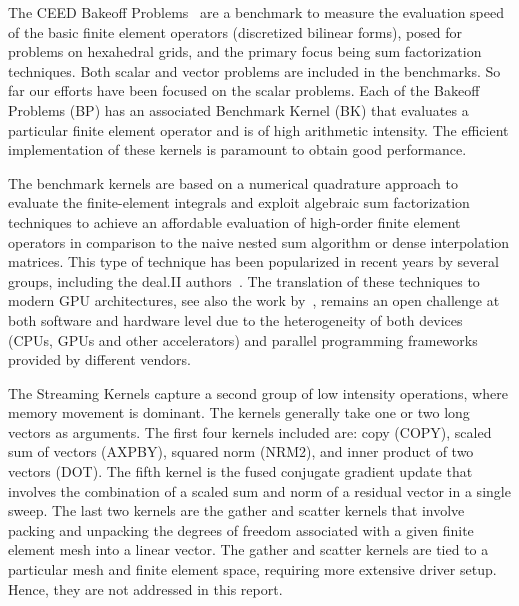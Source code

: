 \documentclass[a4paper,12pt]{article}
\begin{document}
The CEED Bakeoff Problems~\citep{Fischer20scalability} are a benchmark to measure the evaluation speed of the basic finite element operators (discretized bilinear forms), posed for problems on hexahedral grids, and the primary focus being sum factorization techniques. 
Both scalar and vector  problems are included in the benchmarks. So far our efforts have been focused on the scalar problems.
Each of the Bakeoff Problems (BP) has an associated Benchmark Kernel (BK) that evaluates a particular 
finite element operator and is of high arithmetic intensity. 
The efficient implementation of these kernels is paramount to obtain good performance. 

The benchmark kernels are based on a numerical quadrature approach to evaluate the finite-element integrals and exploit algebraic sum factorization techniques \citep{Deville02} to achieve an affordable evaluation of high-order finite element operators in comparison to the naive nested sum algorithm or dense interpolation matrices. This type of technique has been popularized in recent years by several groups, including the deal.II authors~\citep{Kronbichler12,Kronbichler19,Arndt21}. The translation of these techniques to modern GPU architectures, see also the work by~\cite{Swirydowicz19}, remains an open challenge at both software and hardware level due to the heterogeneity of both devices (CPUs, GPUs and other accelerators) and parallel programming frameworks provided by different vendors.

The Streaming Kernels \citep[Table 1]{chalmers20} capture a second group of low intensity operations, where memory movement is dominant.
The kernels generally take one or two long vectors as arguments. 
The first four kernels included are: copy (COPY), scaled sum of vectors (AXPBY), squared norm (NRM2), and inner product of two vectors (DOT). 
The fifth kernel is the fused conjugate gradient update that involves the combination of a scaled sum and norm of a residual vector in a single sweep.    
The last two kernels are the gather and scatter kernels that involve packing and unpacking the degrees of freedom associated with a given finite element mesh into a linear vector.
The gather and scatter kernels are tied to a particular mesh and finite element space, requiring more extensive driver setup. 
Hence, they are not addressed in this report.
\end{document}
